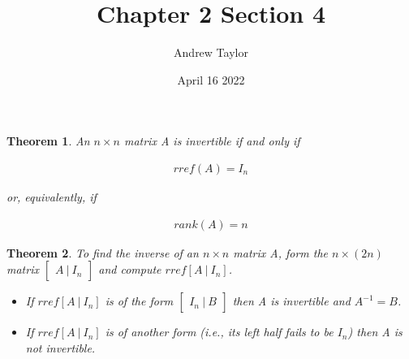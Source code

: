 \documentclass{article}
\title{Chapter 2 Section 4}
\author{Andrew Taylor}
\date{April 16 2022}
\newtheorem{theorem}{Theorem}
\begin{document}
\maketitle

\begin{theorem}
An $n \times n$ matrix A is invertible if and only if

\begin{align*}
rref(A) = I_{n}
\end{align*}

or, equivalently, if

\begin{align*}
rank(A) = n
\end{align*}

\end{theorem}

\begin{theorem}
To find the inverse of an $n \times n$ matrix A, form the $n \times (2n)$ matrix $\begin{bmatrix} A \ \vert \ I_{n} \end{bmatrix}$ and compute $rref [A \ \vert \ I_{n}]$. 

\begin{itemize}
\item If $rref [A \ \vert \ I_{n}]$ is of the form $\begin{bmatrix} I_{n} \ \vert \ B \end{bmatrix}$ then A is invertible and $A^{-1} = B$.
\item If $rref [A \ \vert \ I_{n}]$ is of another form (i.e., its left half fails to be $I_{n}$) then A is not invertible. 
\end{itemize}
\end{theorem}
\end{document}
